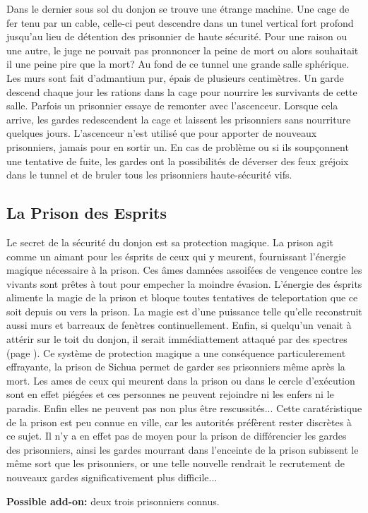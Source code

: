 Dans le dernier sous sol du donjon se trouve une étrange machine. Une cage de fer tenu 
par un cable, celle-ci peut descendre dans un tunel vertical fort profond
jusqu'au lieu de détention des prisonnier de haute sécurité. Pour une 
raison ou une autre, le juge ne pouvait pas pronnoncer la peine de mort
ou alors souhaitait il une peine pire que la mort? Au fond de ce tunnel une grande
salle sphérique. Les murs sont fait d'admantium pur, épais de plusieurs 
centimètres. Un garde descend chaque jour les rations dans la cage pour nourrire les 
survivants de cette salle. Parfois un prisonnier 
essaye de remonter avec l'ascenceur. Lorsque cela arrive, les gardes redescendent la cage et 
laissent les prisonniers sans nourriture quelques jours. L'ascenceur n'est utilisé
que pour apporter de nouveaux prisonniers, jamais pour en sortir un. En cas de
problème ou si ils soupçonnent une tentative de fuite, les gardes ont la possibilités 
de déverser des feux gréjoix dans le tunnel et de bruler tous les prisonniers 
haute-sécurité vifs.

\subsection{La Prison des Esprits}

Le secret de la sécurité du donjon est sa protection magique. La prison
agit comme un aimant pour les ésprits de ceux qui y meurent, fournissant
l'énergie magique nécessaire à la prison. Ces âmes damnées assoifées de vengence
contre les vivants sont prêtes à tout 
pour empecher la moindre évasion. L'énergie des ésprits alimente la magie de 
la prison et bloque toutes 
tentatives de teleportation que ce soit depuis ou vers la prison. La magie est d'une
puissance telle qu'elle reconstruit aussi murs et barreaux de fenètres
continuellement. Enfin, si quelqu'un venait à attérir sur le toit du donjon, il 
serait immédiattement attaqué par des spectres (page \pageref{Spectre}).
Ce système de protection magique a une conséquence particulerement effrayante,
la prison de Sichua permet de garder ses prisonniers même après la mort.
Les ames de
ceux qui meurent dans la prison ou dans le cercle d'exécution sont en effet piégées et
ces personnes ne peuvent rejoindre ni les enfers ni le paradis. Enfin elles ne
peuvent pas non plus être rescussités... Cette caratéristique de la prison est peu connue
en ville, car les autorités préfèrent rester discrètes à ce sujet. Il n'y a
en effet pas de moyen pour la prison de différencier les
gardes des prisonniers, ainsi les gardes mourrant dans l'enceinte de la prison
subissent le même sort que les prisonniers, or une telle nouvelle rendrait le 
recrutement de nouveaux gardes significativement plus difficile...


{\bf Possible add-on:} deux trois prisonniers connus.


